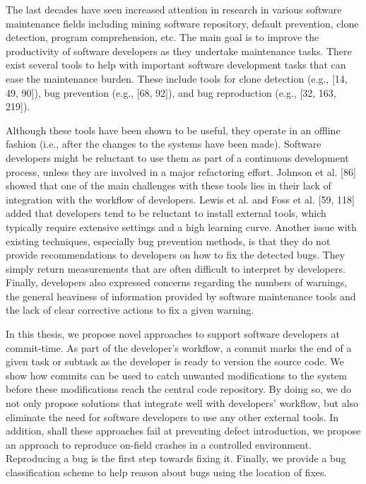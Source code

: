 \documentclass[12pt]{report}
\begin{document}
The last decades have seen increased attention in research in various
software maintenance fields including mining software repository,
default prevention, clone detection, program comprehension, etc. The
main goal is to improve the productivity of software developers as they
undertake maintenance tasks. There exist several tools to help with
important software development tasks that can ease the maintenance
burden. These include tools for clone detection (e.g., {[}14, 49,
90{]}), bug prevention (e.g., {[}68, 92{]}), and bug reproduction (e.g.,
{[}32, 163, 219{]}).

Although these tools have been shown to be useful, they operate in an
offline fashion (i.e., after the changes to the systems have been made).
Software developers might be reluctant to use them as part of a
continuous development process, unless they are involved in a major
refactoring effort. Johnson et al. {[}86{]} showed that one of the main
challenges with these tools lies in their lack of integration with the
workflow of developers. Lewis et al. and Foss et al. {[}59, 118{]} added
that developers tend to be reluctant to install external tools, which
typically require extensive settings and a high learning curve. Another
issue with existing techniques, especially bug prevention methods, is
that they do not provide recommendations to developers on how to fix the
detected bugs. They simply return measurements that are often difficult
to interpret by developers. Finally, developers also expressed concerns
regarding the numbers of warnings, the general heaviness of information
provided by software maintenance tools and the lack of clear corrective
actions to fix a given warning.

In this thesis, we propose novel approaches to support software
developers at commit-time. As part of the developer's workflow, a commit
marks the end of a given task or subtask as the developer is ready to
version the source code. We show how commits can be used to catch
unwanted modifications to the system before these modifications reach
the central code repository. By doing so, we do not only propose
solutions that integrate well with developers' workflow, but also
eliminate the need for software developers to use any other external
tools. In addition, shall these approaches fail at preventing defect
introduction, we propose an approach to reproduce on-field crashes in a
controlled environment. Reproducing a bug is the first step towards
fixing it. Finally, we provide a bug classification scheme to help
reason about bugs using the location of fixes.
\end{document}

